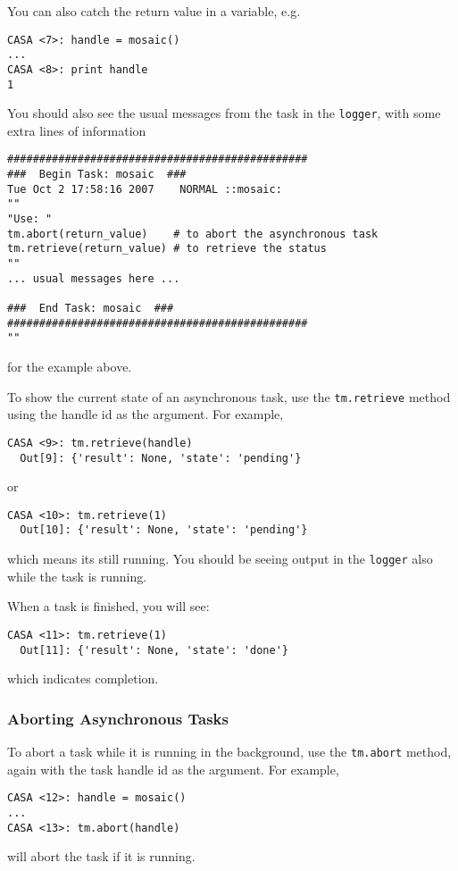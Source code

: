 You can also catch the return value in a variable, e.g.
\small
\begin{verbatim}
CASA <7>: handle = mosaic()
...
CASA <8>: print handle
1
\end{verbatim}
\normalsize
You should also see the usual messages from the task in the 
{\tt logger}, with some extra lines of information
\small
\begin{verbatim}
###############################################
###  Begin Task: mosaic  ###
Tue Oct 2 17:58:16 2007    NORMAL ::mosaic:
""
"Use: "
tm.abort(return_value)    # to abort the asynchronous task
tm.retrieve(return_value) # to retrieve the status
""
... usual messages here ...

###  End Task: mosaic  ###
###############################################
""
\end{verbatim}
\normalsize
for the example above.

To show the current state of an asynchronous task, use the
{\tt tm.retrieve} method using the handle id as the argument.
For example,
\small
\begin{verbatim}
CASA <9>: tm.retrieve(handle)
  Out[9]: {'result': None, 'state': 'pending'}
\end{verbatim}
\normalsize
or
\small
\begin{verbatim}
CASA <10>: tm.retrieve(1)
  Out[10]: {'result': None, 'state': 'pending'}
\end{verbatim}
\normalsize
which means its still running.  You should be seeing output in
the {\tt logger} also while the task is running.  

When a task is finished, you will see:
\small
\begin{verbatim}
CASA <11>: tm.retrieve(1)
  Out[11]: {'result': None, 'state': 'done'}
\end{verbatim}
\normalsize
which indicates completion.

\subsubsection{Aborting Asynchronous Tasks}
\label{section:intro.tasks.async.abort}

To abort a task while it is running in the background, use the
{\tt tm.abort} method, again with the task handle id as the
argument.  For example,
\small
\begin{verbatim}
CASA <12>: handle = mosaic()
...
CASA <13>: tm.abort(handle)
\end{verbatim}
\normalsize
will abort the task if it is running.

